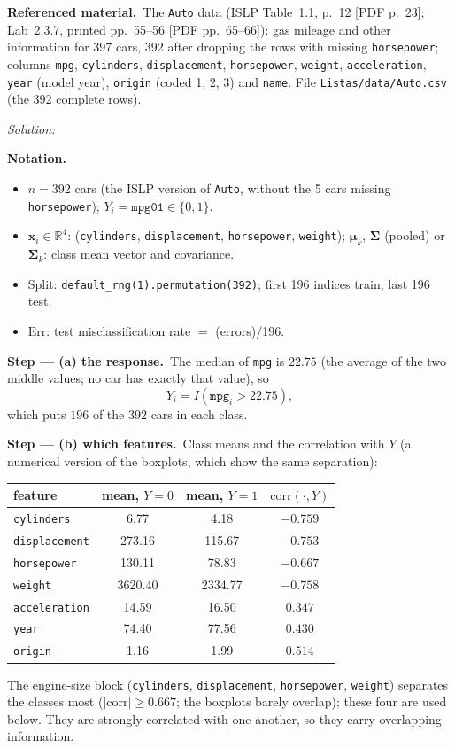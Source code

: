 \documentclass[11pt,a4paper]{article}
\newif\ifsolucoes
\newcommand{\espacoresol}{3.5cm}   %
\numberwithin{equation}{questao}   %
\newenvironment{notacao}{\par\smallskip\noindent\textbf{Notation.}\begin{itemize}[leftmargin=1.4em,topsep=1pt,itemsep=0pt]\small}{\end{itemize}}
\newenvironment{refmat}{\par\smallskip\noindent\begin{small}\textbf{Referenced material.}\ }{\end{small}\par\smallskip}
\newcommand{\resolespaco}{\ifsolucoes\else\par\textit{Solution:}\vspace{\espacoresol}\par\fi}
\newcommand{\passo}[2]{\par\smallskip\noindent\textbf{Step --- #1.}~#2}
\begin{document}
\begin{refmat}The \texttt{Auto} data (ISLP Table~1.1, p.~12 [PDF p.~23]; Lab~2.3.7, printed
pp.~55--56 [PDF pp.~65--66]): gas mileage and other information for 397 cars, 392 after dropping the
rows with missing \texttt{horsepower}; columns \texttt{mpg}, \texttt{cylinders}, \texttt{displacement},
\texttt{horsepower}, \texttt{weight}, \texttt{acceleration}, \texttt{year} (model year), \texttt{origin}
(coded 1, 2, 3) and \texttt{name}. File \texttt{Listas/data/Auto.csv} (the 392 complete rows).\end{refmat}
\resolespaco
\begin{sol}
\begin{notacao}
\item $n=392$ cars (the ISLP version of \texttt{Auto}, without the 5 cars missing \texttt{horsepower});
  $Y_i=\texttt{mpg01}\in\{0,1\}$.
\item $\mathbf x_i\in\mathbb R^4$: (\texttt{cylinders}, \texttt{displacement}, \texttt{horsepower}, \texttt{weight});
  $\boldsymbol\mu_k$, $\boldsymbol\Sigma$ (pooled) or $\boldsymbol\Sigma_k$: class mean vector and covariance.
\item Split: \texttt{default\_rng(1).permutation(392)}; first 196 indices train, last 196 test.
\item $\mathrm{Err}$: test misclassification rate $=$ (errors)/196.
\end{notacao}

\passo{(a) the response}{The median of \texttt{mpg} is $22.75$ (the average of the two middle values; no car has exactly that value), so
\begin{equation}\label{eq:I414-y}
Y_i=I(\texttt{mpg}_i>22.75),
\end{equation}
which puts $196$ of the $392$ cars in each class.}

\passo{(b) which features}{Class means and the correlation with $Y$ (a numerical version of the
boxplots, which show the same separation):
\begin{center}\begin{tabular}{lccc}\toprule
feature & mean, $Y=0$ & mean, $Y=1$ & $\mathrm{corr}(\cdot,Y)$\\\midrule
\texttt{cylinders} & 6.77 & 4.18 & $-0.759$\\
\texttt{displacement} & 273.16 & 115.67 & $-0.753$\\
\texttt{horsepower} & 130.11 & 78.83 & $-0.667$\\
\texttt{weight} & 3620.40 & 2334.77 & $-0.758$\\
\texttt{acceleration} & 14.59 & 16.50 & $0.347$\\
\texttt{year} & 74.40 & 77.56 & $0.430$\\
\texttt{origin} & 1.16 & 1.99 & $0.514$\\\bottomrule\end{tabular}\end{center}
The engine-size block (\texttt{cylinders}, \texttt{displacement}, \texttt{horsepower}, \texttt{weight}) separates
the classes most ($|\mathrm{corr}|\ge0.667$; the boxplots barely overlap); these four are used
below. They are strongly correlated with one another, so they carry overlapping information.}


\end{sol}
\end{document}
